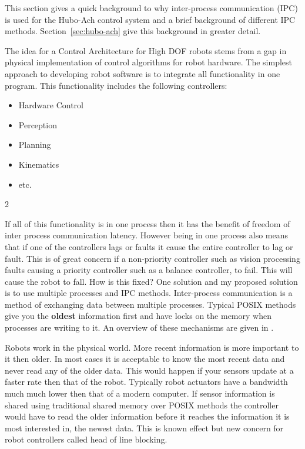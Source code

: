 
This section gives a quick background to why inter-process communication (IPC) is used for the Hubo-Ach control system and a brief background of different IPC methods.
Section~\ref{sec:hubo-ach} give this background in greater detail.

The idea for a Control Architecture for High DOF robots stems from a gap in physical implementation of control algorithms for robot hardware.
The simplest approach to developing robot software is to integrate all functionality in one program.  
This functionality includes the following controllers:
\begin{multicols}{2}
\begin{itemize}
\item Hardware Control
\item Perception
\item Planning
\item Kinematics
\item etc.
\end{itemize}
\end{multicols}{2}

If all of this functionality is in one process then it has the benefit of freedom of inter process communication latency.
However being in one process also means that if one of the controllers lags or faults it cause the entire controller to lag or fault.
This is of great concern if a non-priority controller such as vision processing faults causing a priority controller such as a balance controller, to fail.
This will cause the robot to fall.
How is this fixed?
One solution and my proposed solution is to use multiple processes and IPC methods.
Inter-process communication is a method of exchanging data between multiple processes.
Typical POSIX methods give you the \textbf{oldest} information first and have locks on the memory when processes are writing to it.
An overview of these mechanisms are given in \cite{stevens2005advanced}.

Robots work in the physical world. 
More recent information is more important to it then older.
In most cases it is acceptable to know the most recent data and never read any of the older data.
This would happen if your sensors update at a faster rate then that of the robot.
Typically robot actuators have a bandwidth much much lower then that of a modern computer.
If sensor information is shared using traditional shared memory over POSIX methods the controller would have to read the older information before it reaches the information it is most interested in, the newest data.
This is known effect but new concern for robot controllers called head of line blocking\cite{ach}.

